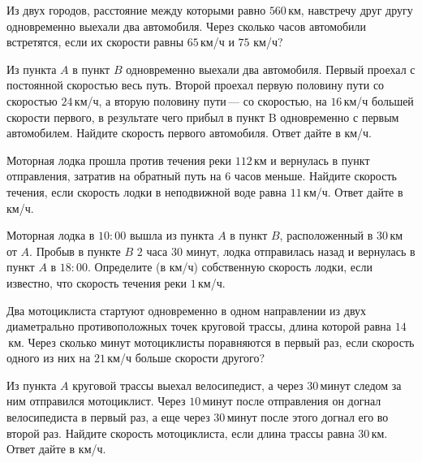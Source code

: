 \begin{class}[number=7]
	\begin{listofex}
		\item Из двух городов, расстояние между которыми равно \(560\) км, навстречу друг другу одновременно выехали два автомобиля. Через сколько часов автомобили встретятся, если их скорости равны \(65\) км/ч и \(75\) км/ч?
		\item Из пункта \(A\) в пункт \(B\) одновременно выехали два автомобиля. Первый проехал с постоянной скоростью весь путь. Второй проехал первую половину пути со скоростью \(24\) км/ч, а вторую половину пути --- со скоростью, на \(16\) км/ч большей скорости первого, в результате чего прибыл в пункт B одновременно с первым автомобилем. Найдите скорость первого автомобиля. Ответ дайте в км/ч.
		\item Моторная лодка прошла против течения реки \(112\) км и вернулась в пункт отправления, затратив на обратный путь на \(6\) часов меньше. Найдите скорость течения, если скорость лодки в неподвижной воде равна \(11\) км/ч. Ответ дайте в км/ч.
		\item Моторная лодка в \(10:00\) вышла из пункта \(A\) в пункт \(B\), расположенный в \(30\) км от \(A\). Пробыв в пункте \(B\) \(2\) часа \(30\) минут, лодка отправилась назад и вернулась в пункт \(A\) в \(18:00\). Определите (в км/ч) собственную скорость лодки, если известно, что скорость течения реки \(1\) км/ч.
		\item Два мотоциклиста стартуют одновременно в одном направлении из двух диаметрально противоположных точек круговой трассы, длина которой равна \(14\) км. Через сколько минут мотоциклисты поравняются в первый раз, если скорость одного из них на \(21\) км/ч больше скорости другого?
		\item Из пункта \(A\) круговой трассы выехал велосипедист, а через \(30\) минут следом за ним отправился мотоциклист. Через \(10\) минут после отправления он догнал велосипедиста в первый раз, а еще через \(30\) минут после этого догнал его во второй раз. Найдите скорость мотоциклиста, если длина трассы равна \(30\) км. Ответ дайте в км/ч.
		

\end{listofex}
\end{class}
